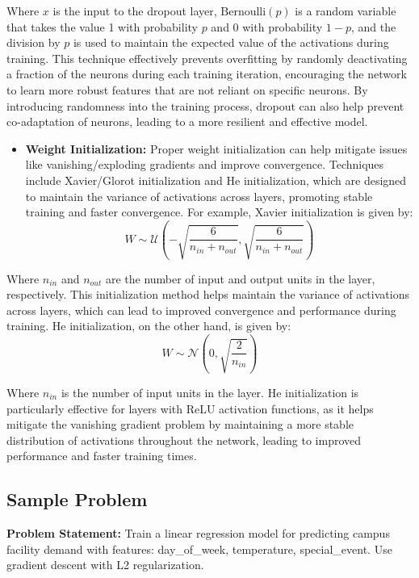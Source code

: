 \documentclass[
  letterpaper,
  DIV=11,
  numbers=noendperiod]{scrreprt}
\providecommand{\tightlist}{%
  \setlength{\itemsep}{0pt}\setlength{\parskip}{0pt}}
\begin{document}
Where \(x\) is the input to the dropout layer, \(\text{Bernoulli}(p)\)
is a random variable that takes the value 1 with probability \(p\) and 0
with probability \(1-p\), and the division by \(p\) is used to maintain
the expected value of the activations during training. This technique
effectively prevents overfitting by randomly deactivating a fraction of
the neurons during each training iteration, encouraging the network to
learn more robust features that are not reliant on specific neurons. By
introducing randomness into the training process, dropout can also help
prevent co-adaptation of neurons, leading to a more resilient and
effective model.

\begin{itemize}
\tightlist
\item
  \textbf{Weight Initialization:} Proper weight initialization can help
  mitigate issues like vanishing/exploding gradients and improve
  convergence. Techniques include Xavier/Glorot initialization and He
  initialization, which are designed to maintain the variance of
  activations across layers, promoting stable training and faster
  convergence. For example, Xavier initialization is given by:
  \[W \sim \mathcal{U}\left(-\sqrt{\frac{6}{n_{in} + n_{out}}}, \sqrt{\frac{6}{n_{in} + n_{out}}}\right)\]
\end{itemize}

Where \(n_{in}\) and \(n_{out}\) are the number of input and output
units in the layer, respectively. This initialization method helps
maintain the variance of activations across layers, which can lead to
improved convergence and performance during training. He initialization,
on the other hand, is given by:
\[W \sim \mathcal{N}\left(0, \sqrt{\frac{2}{n_{in}}}\right)\]

Where \(n_{in}\) is the number of input units in the layer. He
initialization is particularly effective for layers with ReLU activation
functions, as it helps mitigate the vanishing gradient problem by
maintaining a more stable distribution of activations throughout the
network, leading to improved performance and faster training times.

\subsection{Sample Problem}\label{sample-problem-19}

\textbf{Problem Statement:} Train a linear regression model for
predicting campus facility demand with features: day\_of\_week,
temperature, special\_event. Use gradient descent with L2
regularization.
\end{document}
